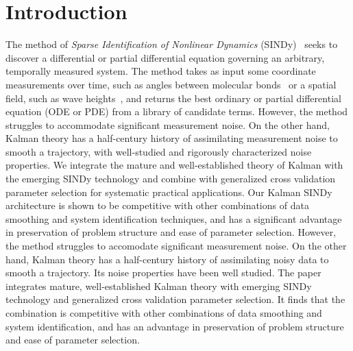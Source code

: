 \documentclass{article}
\begin{document}
\section{Introduction}
The method of {\em Sparse Identification of Nonlinear Dynamics} (SINDy)~\cite{Brunton2016,brunton2022data} seeks to discover a differential or partial differential equation governing an arbitrary, temporally measured system.
The method takes as input some coordinate measurements over time, such as angles between molecular bonds~\cite{Boninsegna2018} or a spatial field, such as wave heights~\cite{Rudy2017}, and returns the best ordinary or partial differential equation (ODE or PDE) from a library of candidate terms.
However, the method struggles to accommodate significant measurement noise.
On the other hand, Kalman theory has a half-century history of assimilating measurement noise to smooth a trajectory, with well-studied and rigorously characterized noise properties.
We integrate the mature and well-established theory of Kalman with the emerging SINDy technology and combine with generalized cross validation parameter selection for systematic practical applications.
Our Kalman SINDy architecture is shown to be competitive with other combinations of data smoothing and system identification techniques, and has a significant advantage in preservation of problem structure and ease of parameter selection.
However, the method struggles to accomodate significant measurement noise.
On the other hand, Kalman theory has a half-century history of assimilating noisy data to smooth a trajectory.
Its noise properties have been well studied.
The paper integrates mature, well-established Kalman theory with emerging SINDy technology and generalized cross validation parameter selection.
It finds that the combination is competitive with other combinations of data smoothing and system identification, and has an advantage in preservation of problem structure and ease of parameter selection.
\end{document}
